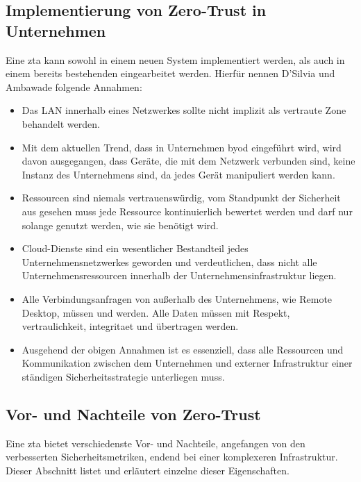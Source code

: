 \subsection{Implementierung von Zero-Trust in Unternehmen}\label{subsec:implementierung-von-zero-trust-in-unternehmen}
Eine \ac{zta} kann sowohl in einem neuen System implementiert werden, als auch in einem bereits bestehenden eingearbeitet werden.
Hierfür nennen D'Silvia und Ambawade\autocite[\vglf][]{dsilvia-2021} folgende Annahmen:
\begin{itemize}
    \item Das LAN innerhalb eines Netzwerkes sollte nicht implizit als vertraute Zone behandelt werden.
    \item Mit dem aktuellen Trend, dass in Unternehmen \ac{byod} eingeführt wird, wird davon ausgegangen, dass Geräte, die mit dem Netzwerk verbunden sind, keine Instanz des Unternehmens sind, da jedes Gerät manipuliert werden kann.
    \item Ressourcen sind niemals vertrauenswürdig, \dah vom Standpunkt der Sicherheit aus gesehen muss jede Ressource kontinuierlich bewertet werden und darf nur solange genutzt werden, wie sie benötigt wird.
    \item Cloud-Dienste sind ein wesentlicher Bestandteil jedes Unternehmensnetzwerkes geworden und verdeutlichen, dass nicht alle Unternehmensressourcen innerhalb der Unternehmensinfrastruktur liegen.
    \item Alle Verbindungsanfragen von außerhalb des Unternehmens, wie \zb Remote Desktop, müssen  und  werden.
    Alle Daten müssen mit Respekt, \gls{vertraulichkeit}, \gls{integritaet} und  übertragen werden.
    \item Ausgehend der obigen Annahmen ist es essenziell, dass alle Ressourcen und Kommunikation zwischen dem Unternehmen und externer Infrastruktur einer ständigen Sicherheitsstrategie unterliegen muss.
\end{itemize}

\subsection{Vor- und Nachteile von Zero-Trust}\label{subsec:vor-und-nachteile-von-zero-trust}
Eine \ac{zta} bietet verschiedenste Vor- und Nachteile, angefangen von den verbesserten Sicherheitsmetriken, endend bei einer komplexeren Infrastruktur.
Dieser Abschnitt listet und erläutert einzelne dieser Eigenschaften.

